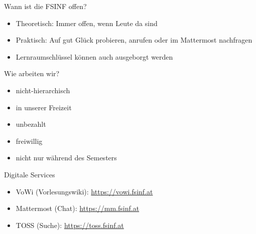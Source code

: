 \documentclass{beamer}
\begin{document}
\begin{frame}{Wann ist die FSINF offen?}
    \begin{itemize}
        \item Theoretisch: Immer offen, wenn Leute da sind
        \item Praktisch: Auf gut Glück probieren, anrufen oder im Mattermost nachfragen
        \item Lernraumschlüssel können auch ausgeborgt werden
    \end{itemize}
\end{frame}

\begin{frame}{Wie arbeiten wir?}
    \begin{itemize}
        \item nicht-hierarchisch
        \item in unserer Freizeit
        \item unbezahlt
        \item freiwillig
        \item nicht nur während des Semesters
    \end{itemize}
\end{frame}

\begin{frame}{Digitale Services}
    \begin{itemize}
        \item VoWi (Vorlesungswiki): \url{https://vowi.fsinf.at}
        \item Mattermost (Chat): \url{https://mm.fsinf.at}
        \item TOSS (Suche): \url{https://toss.fsinf.at}
    \end{itemize}
\end{frame}
\end{document}
